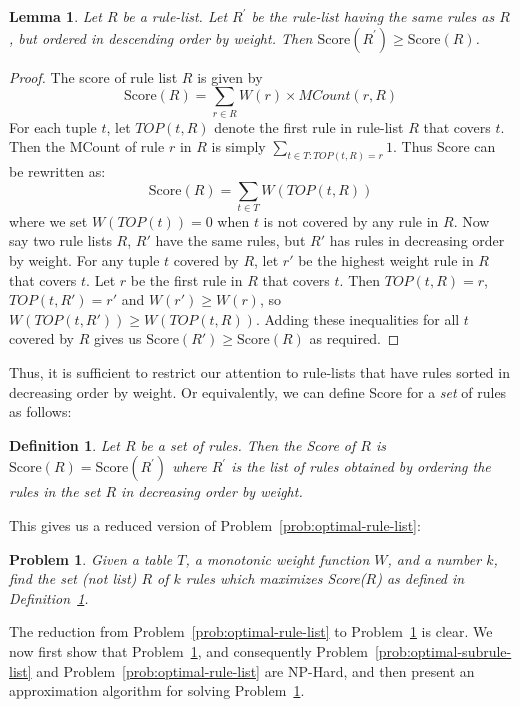 \documentclass[10pt,journal,compsoc]{IEEEtran}
\newtheorem{lemma}{Lemma}
\newtheorem{definition}{Definition}
\newcounter{prob}
\newtheorem{problem}[prob]{Problem}
\newcommand{\papertext}[1]{}
\newcommand{\techreporttext}[1]{#1}
\begin{document}
\begin{lemma}\label{lemma:rule-ordering}
Let $R$ be a rule-list. Let $R^{\prime}$ be the rule-list having the same rules as $R$, but ordered in descending order by weight. Then
$\text{Score}(R^{\prime}) \geq \text{Score}(R)$.
\end{lemma}
\papertext{The proof of this lemma, as well as other proofs, can be found in the technical report~\cite{tr}.}\techreporttext{
\begin{proof}
The score of rule list $R$ is given by $$\text{Score}(R) = \sum_{r \in R} W(r) \times MCount(r,R)$$
For each tuple $t$, let $TOP(t,R)$ denote the first rule in rule-list $R$ that covers $t$. Then the MCount of rule $r$ in $R$ is simply $\sum_{t \in T : TOP(t,R) = r} 1$. Thus Score can be rewritten as:
$$\text{Score}(R) = \sum_{t \in T} W(TOP(t,R))$$
where we set $W(TOP(t)) = 0$ when $t$ is not covered by any rule in $R$. Now say two rule lists $R$, $R'$ have the same rules, but $R'$ has rules in decreasing order by weight. For any tuple $t$ covered by $R$, let $r'$ be the highest weight rule in $R$ that covers $t$. Let $r$ be the first rule in $R$ that covers $t$. Then $TOP(t,R) = r$, $TOP(t, R') = r'$ and $W(r') \geq W(r)$, so $W(TOP(t,R')) \geq W(TOP(t,R))$. Adding these inequalities for all $t$ covered by $R$ gives us $\text{Score}(R') \geq \text{Score}(R)$ as required.
\end{proof}
}
Thus, it is sufficient to restrict our attention to rule-lists that have rules sorted in decreasing order by weight. Or equivalently, we can define Score for a \emph{set} of rules as follows:

\begin{definition}\label{def:set-score}
Let $R$ be a set of rules. Then the Score of $R$ is
$\text{Score}(R) = \text{Score}(R^{\prime})$
where $R^{\prime}$ is the list of rules obtained by ordering the rules in the set $R$ in decreasing order by weight.
\end{definition}

This gives us a reduced version of Problem~\ref{prob:optimal-rule-list}: 
\begin{problem}\label{prob:optimal-rule-set}
Given a table $T$, a monotonic weight function $W$, and a number $k$, find the set (not list) $R$ of $k$ rules which maximizes Score($R$) as defined in Definition~\ref{def:set-score}.
\end{problem}

\noindent The reduction from Problem~\ref{prob:optimal-rule-list} to Problem~\ref{prob:optimal-rule-set} is clear. We now first show that Problem~\ref{prob:optimal-rule-set}, and consequently Problem~\ref{prob:optimal-subrule-list} and Problem~\ref{prob:optimal-rule-list} are {\sc NP-Hard}, and then present an approximation algorithm for solving Problem~\ref{prob:optimal-rule-set}.
\end{document}
